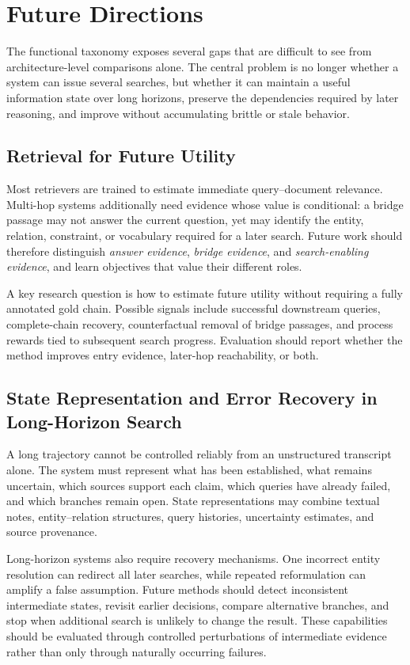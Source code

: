 \section{Future Directions}
\label{sec:future}

The functional taxonomy exposes several gaps that are difficult to see from architecture-level comparisons alone. The central problem is no longer whether a system can issue several searches, but whether it can maintain a useful information state over long horizons, preserve the dependencies required by later reasoning, and improve without accumulating brittle or stale behavior.

\subsection{Retrieval for Future Utility}
Most retrievers are trained to estimate immediate query--document relevance. Multi-hop systems additionally need evidence whose value is conditional: a bridge passage may not answer the current question, yet may identify the entity, relation, constraint, or vocabulary required for a later search. Future work should therefore distinguish \emph{answer evidence}, \emph{bridge evidence}, and \emph{search-enabling evidence}, and learn objectives that value their different roles.

A key research question is how to estimate future utility without requiring a fully annotated gold chain. Possible signals include successful downstream queries, complete-chain recovery, counterfactual removal of bridge passages, and process rewards tied to subsequent search progress. Evaluation should report whether the method improves entry evidence, later-hop reachability, or both.

\subsection{State Representation and Error Recovery in Long-Horizon Search}
A long trajectory cannot be controlled reliably from an unstructured transcript alone. The system must represent what has been established, what remains uncertain, which sources support each claim, which queries have already failed, and which branches remain open. State representations may combine textual notes, entity--relation structures, query histories, uncertainty estimates, and source provenance.

Long-horizon systems also require recovery mechanisms. One incorrect entity resolution can redirect all later searches, while repeated reformulation can amplify a false assumption. Future methods should detect inconsistent intermediate states, revisit earlier decisions, compare alternative branches, and stop when additional search is unlikely to change the result. These capabilities should be evaluated through controlled perturbations of intermediate evidence rather than only through naturally occurring failures.

